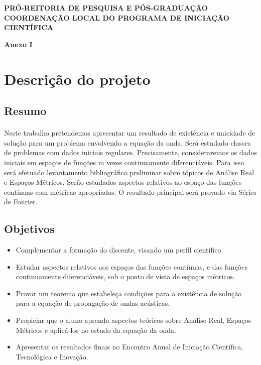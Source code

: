 \documentclass[a4paper,12pt]{article}
\begin{document}
\begin{flushleft}
    \textbf{\large PRÓ-REITORIA DE PESQUISA E PÓS-GRADUAÇÃO}
    \linebreak
    \linebreak
    \textbf{\large COORDENAÇÃO LOCAL DO PROGRAMA DE INICIAÇÃO CIENTÍFICA}
\end{flushleft}


\begin{center}
    \Large \bf Anexo I
\end{center}

\section{Descrição do projeto}

\subsection{Resumo}
\paragraph*{}


Neste trabalho pretendemos apresentar um resultado de existência e unicidade de
solução para um problema envolvendo a equação da onda. Será estudado classes de
problemas com dados iniciais regulares. Precisamente, consideraremos os dados
iniciais em espaços de funções m vezes continuamente diferenciáveis. Para isso será
efetuado levantamento bibliográfico preliminar sobre tópicos de Análise Real e
Espaços Métricos. Serão estudados aspectos relativos ao espaço das funções
contínuas com métricas apropriadas. O resultado principal será provado via Séries de
Fourier.

\subsection{Objetivos}

\begin{itemize}
    \item Complementar a formação do discente, visando um perfil científico.

    \item Estudar aspectos relativos aos espaços das funções contínuas, e das funções
          continuamente diferenciáveis, sob o ponto de vista de espaços métricos.

    \item Provar um teorema que estabeleça condições para a existência de solução
          para a equação de propagação de ondas acústicas.

    \item Propiciar que o aluno aprenda aspectos teóricos sobre Análise Real, Espaços
          Métricos e aplicá-los no estudo da equação da onda.

    \item Apresentar os resultados finais no Encontro Anual de Iniciação Científica,
          Tecnológica e Inovação.
\end{itemize}
\end{document}
